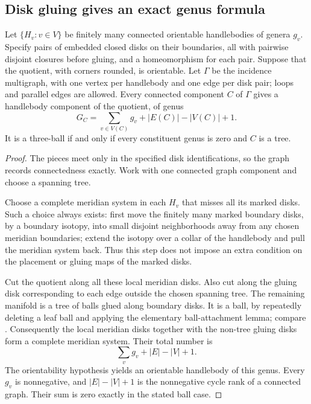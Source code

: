\subsection{Disk gluing gives an exact genus formula}
\label{geo:disk-gluing}

\begin{theorem}
\label{geo:thm-disk-gluing}
Let $\{H_v:v\in V\}$ be finitely many connected orientable handlebodies of
genera $g_v$.  Specify pairs of embedded closed disks on their boundaries,
all with pairwise disjoint closures before gluing, and a homeomorphism for
each pair.  Suppose that the quotient, with corners rounded, is orientable.
Let $\Gamma$ be the incidence multigraph, with one vertex per handlebody
and one edge per disk pair; loops and parallel edges are allowed.  Every
connected component $C$ of $\Gamma$ gives a handlebody component of the
quotient, of genus
\[
 G_C=\sum_{v\in V(C)}g_v+|E(C)|-|V(C)|+1.
 \tag{G8}\label{geo:eq-gluing-genus}
\]
It is a three-ball if and only if every constituent genus is zero and
$C$ is a tree.
\end{theorem}

\begin{proof}
The pieces meet only in the specified disk identifications, so the graph
records connectedness exactly.  Work with one connected graph component
and choose a spanning tree.

Choose a complete meridian system in each $H_v$ that misses all its marked
disks.  Such a choice always exists: first move the finitely many marked
boundary disks, by a boundary isotopy, into small disjoint neighborhoods
away from any chosen meridian boundaries; extend the isotopy over a collar
of the handlebody and pull the meridian system back.  Thus this step does
not impose an extra condition on the placement or gluing maps of the
marked disks.

Cut the quotient along all these local meridian disks.  Also cut along the
gluing disk corresponding to each edge outside the chosen spanning tree.
The remaining manifold is a tree of balls glued along boundary disks.  It
is a ball, by repeatedly deleting a leaf ball and applying the elementary
ball-attachment lemma; compare \cite[Lemma~1.3]{Hatcher2007}.  Consequently
the local meridian disks together with the non-tree gluing disks form a
complete meridian system.  Their total number is
\[
 \sum_v g_v+|E|-|V|+1.
\]
The orientability hypothesis yields an orientable handlebody of this
genus.  Every $g_v$ is nonnegative, and $|E|-|V|+1$ is the nonnegative cycle
rank of a connected graph.  Their sum is zero exactly in the stated ball
case.
\end{proof}

